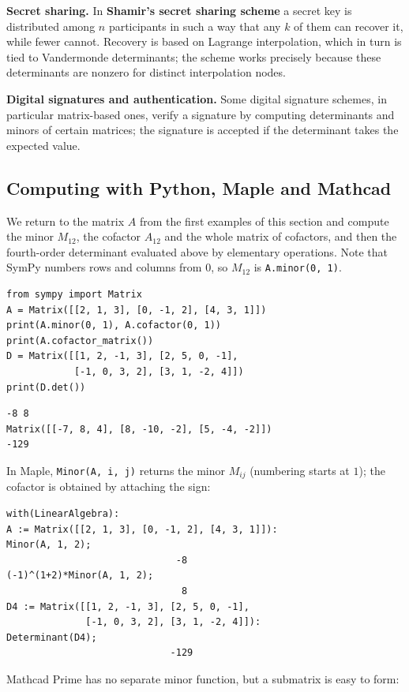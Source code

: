 \textbf{Secret sharing.}
In \textbf{Shamir’s secret sharing scheme} a secret key is distributed among $n$
participants in such a way that any $k$ of them can recover it, while fewer
cannot. Recovery is based on Lagrange interpolation, which in turn is tied to
Vandermonde determinants; the scheme works precisely because these determinants
are nonzero for distinct interpolation nodes.

\textbf{Digital signatures and authentication.}
Some digital signature schemes, in particular matrix-based ones, verify a signature
by computing determinants and minors of certain matrices; the signature is
accepted if the determinant takes the expected value.

\subsection{Computing with Python, Maple and Mathcad}
We return to the matrix $A$ from the first examples of this section and compute
the minor $M_{12}$, the cofactor $A_{12}$ and the whole matrix of cofactors, and
then the fourth-order determinant evaluated above by elementary operations.
Note that SymPy numbers rows and columns from $0$, so $M_{12}$ is
\texttt{A.minor(0, 1)}.
\begin{Verbatim}[fontsize=\footnotesize,frame=single,label={\small Python}]
from sympy import Matrix
A = Matrix([[2, 1, 3], [0, -1, 2], [4, 3, 1]])
print(A.minor(0, 1), A.cofactor(0, 1))
print(A.cofactor_matrix())
D = Matrix([[1, 2, -1, 3], [2, 5, 0, -1],
            [-1, 0, 3, 2], [3, 1, -2, 4]])
print(D.det())
\end{Verbatim}
\begin{Verbatim}[fontsize=\footnotesize,frame=single,label={\small Output}]
-8 8
Matrix([[-7, 8, 4], [8, -10, -2], [5, -4, -2]])
-129
\end{Verbatim}
In Maple, \texttt{Minor(A, i, j)} returns the minor $M_{ij}$ (numbering starts
at $1$); the cofactor is obtained by attaching the sign:
\begin{Verbatim}[fontsize=\footnotesize,frame=single,label={\small Maple}]
with(LinearAlgebra):
A := Matrix([[2, 1, 3], [0, -1, 2], [4, 3, 1]]):
Minor(A, 1, 2);
                              -8
(-1)^(1+2)*Minor(A, 1, 2);
                               8
D4 := Matrix([[1, 2, -1, 3], [2, 5, 0, -1],
              [-1, 0, 3, 2], [3, 1, -2, 4]]):
Determinant(D4);
                             -129
\end{Verbatim}
Mathcad Prime has no separate minor function, but a submatrix is easy to form:
